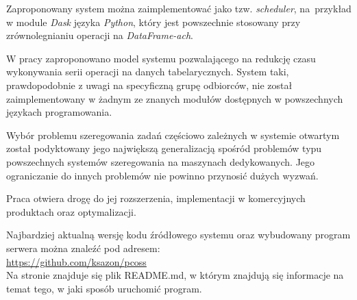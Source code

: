 \documentclass[brudnopis]{xmgr}
\begin{document}
Zaproponowany system można zaimplementować jako tzw. \emph{scheduler}, na~przykład w module \emph{Dask} \cite{dask} języka \emph{Python}, który jest powszechnie stosowany przy zrównolegnianiu operacji na \emph{DataFrame-ach}.



\summary

W pracy zaproponowano model systemu pozwalającego na redukcję czasu wykonywania serii operacji na danych tabelarycznych. System taki, prawdopodobnie z uwagi na specyficzną grupę odbiorców, nie został zaimplementowany w żadnym ze znanych modułów dostępnych w powszechnych językach programowania.
\medskip

Wybór problemu szeregowania zadań częściowo zależnych w systemie otwartym został podyktowany jego największą generalizacją spośród problemów typu powszechnych systemów szeregowania na maszynach dedykowanych. Jego ograniczanie do innych problemów nie powinno przynosić dużych wyzwań.
\medskip

Praca otwiera drogę do jej rozszerzenia, implementacji w komercyjnych produktach oraz optymalizacji.
\medskip

Najbardziej aktualną wersję kodu źródłowego systemu oraz wybudowany program serwera można znaleźć pod adresem:\\ \url{https://github.com/ksazon/pcoss}\\
Na stronie znajduje się plik README.md, w którym znajdują się informacje na temat tego, w jaki sposób uruchomić program.





% 
% 


% 
\printbibliography[nottype=online,title={Bibliografia}]
\printbibliography[type=online,title={Źródła internetowe}]
\listoftables

\listoffigures

\end{document}
